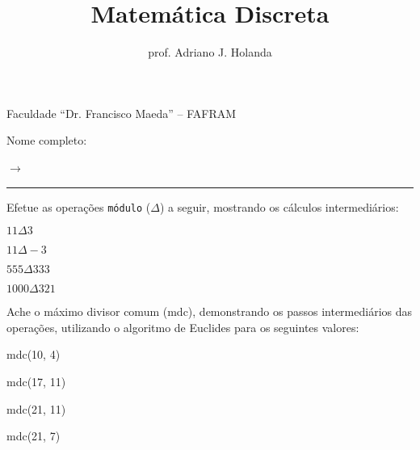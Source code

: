 \documentclass[11pt,a4paper]{article}
\title{Matemática Discreta}
\author{prof. Adriano J. Holanda}
\def\mod#1#2{$#1\Delta#2$}
\newcounter{exn}\setcounter{exn}{0}
\def\ex#1{\paragraph{Questão \arabic{exn}\addtocounter{exn}{1}.} \marginpar{\footnotesize \hfill #1 ponto(s)}}
\begin{document}
\maketitle

\noindent Faculdade ``Dr. Francisco Maeda'' -- FAFRAM\\
\begin{minipage}{.225\textwidth}
\noindent Nome completo:
\end{minipage}
\begin{minipage}{.8\textwidth}
  {$\rightarrow$}~\hrule
\end{minipage}



 Efetue as operações {\tt módulo} ($\Delta$) a seguir, mostrando
os cálculos intermediários:

\begin{enumerate}[(a)]
\begin{minipage}{.5\textwidth}
\item \mod{11}{3}
\item \mod{11}{-3}
\end{minipage}
\begin{minipage}{.5\textwidth}
\item \mod{555}{333}
\item \mod{1000}{321}
\end{minipage}
\end{enumerate}

 Ache o máximo divisor comum (mdc), demonstrando os passos
intermediários das operações, utilizando o algoritmo de Euclides para
os seguintes valores:

\begin{enumerate}[(a)]
\begin{minipage}{.5\textwidth}
\item mdc(10, 4)
\item mdc(17, 11)
\end{minipage}
\begin{minipage}{.5\textwidth}
\item mdc(21, 11)
\item mdc(21, 7)
\end{minipage}
\end{enumerate}
\end{document}
